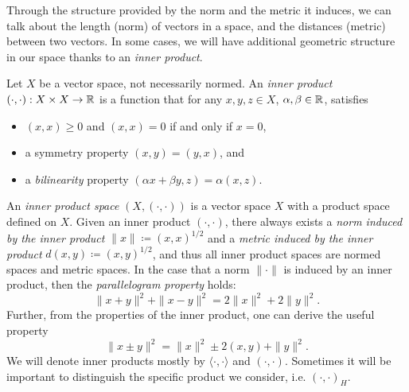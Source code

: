 Through the structure provided by the norm and the metric it induces, we can talk about the length (norm) of vectors in a space, and the distances (metric) between two vectors. In some cases, we will have additional geometric structure in our space thanks to an \emph{inner product}. 
\begin{definition}
    Let $X$ be a vector space, not necessarily normed. An \emph{inner product} $(\cdot,\cdot):X\times X\to \mathbb{R}$ is a function that for any $x,y,z\in X$, $\alpha, \beta\in\mathbb{R}$, satisfies
    \begin{itemize}
        \item $(x,x)\geq 0$ and $(x,x)=0$ if and only if $x=0$, 
        \item a symmetry property $(x,y)=(y,x)$, and
        \item a \emph{bilinearity} property $(\alpha x+\beta y, z)=\alpha(x,z)$.
    \end{itemize}
    An \emph{inner product space} $(X,(\cdot,\cdot))$ is a vector space $X$ with a product space defined on $X$. Given an inner product $(\cdot,\cdot)$, there always exists a \emph{norm induced by the inner product} $\|x\|\coloneqq (x,x)^{1/2}$ and a \emph{metric induced by the inner product} $d(x,y)\coloneqq (x,y)^{1/2}$, and thus all inner product spaces are normed spaces and metric spaces. In the case that a norm $\|\cdot\|$ is induced by an inner product, then the \emph{parallelogram property} holds:
    \begin{equation}
        \|x+y\|^2 + \|x-y\|^2 = 2\|x\|^2 + 2\|y\|^2.
    \end{equation}
    Further, from the properties of the inner product, one can derive the useful property 
    \begin{equation}
        \|x\pm y\|^2 = \|x\|^2 \pm 2(x,y) + \|y\|^2.
    \end{equation}
    We will denote inner products mostly by $\langle\cdot, \cdot\rangle$ and $(\cdot, \cdot)$. Sometimes it will be important to distinguish the specific product we consider, i.e. $(\cdot, \cdot)_H$. 
\end{definition}

